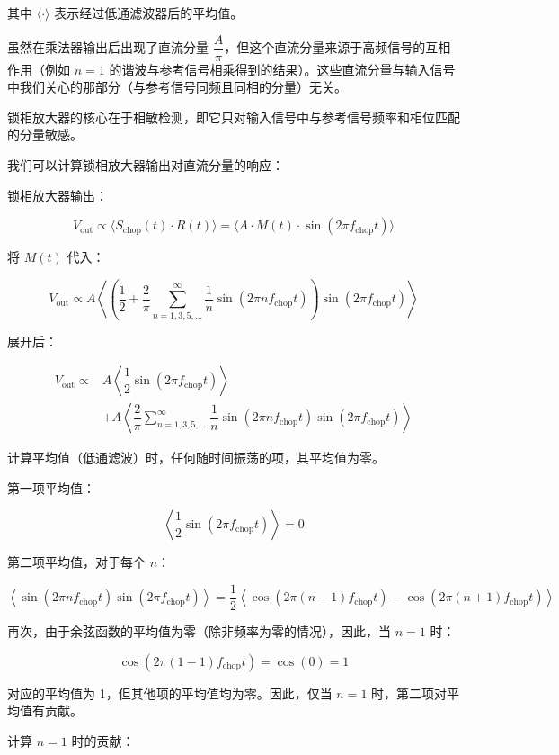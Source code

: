 \documentclass[dvipsnames, svgnames,a4paper,11pt]{article}
\begin{document}
其中 \( \langle \cdot \rangle \) 表示经过低通滤波器后的平均值。

虽然在乘法器输出后出现了直流分量 \( \dfrac{A}{\pi} \)，但这个直流分量来源于高频信号的互相作用（例如 \( n = 1 \) 的谐波与参考信号相乘得到的结果）。这些直流分量与输入信号中我们关心的那部分（与参考信号同频且同相的分量）无关。

锁相放大器的核心在于相敏检测，即它只对输入信号中与参考信号频率和相位匹配的分量敏感。

我们可以计算锁相放大器输出对直流分量的响应：

锁相放大器输出：

\[
V_{\text{out}} \propto \langle S_{\text{chop}}(t) \cdot R(t) \rangle = \langle A \cdot M(t) \cdot \sin(2\pi f_{\text{chop}} t) \rangle
\]

将 \( M(t) \) 代入：

\[
V_{\text{out}} \propto A \left\langle \left( \dfrac{1}{2} + \dfrac{2}{\pi} \sum_{n=1,3,5,\dots}^{\infty} \dfrac{1}{n} \sin(2\pi n f_{\text{chop}} t) \right) \sin(2\pi f_{\text{chop}} t) \right\rangle
\]

展开后：

\[
\begin{aligned}
	V_{\text{out}} \propto & A \left\langle \dfrac{1}{2} \sin(2\pi f_{\text{chop}} t) \right\rangle \\
	& + A \left\langle \dfrac{2}{\pi} \sum_{n=1,3,5,\dots}^{\infty} \dfrac{1}{n} \sin(2\pi n f_{\text{chop}} t) \sin(2\pi f_{\text{chop}} t) \right\rangle
\end{aligned}
\]

计算平均值（低通滤波）时，任何随时间振荡的项，其平均值为零。

第一项平均值：

\[
\left\langle \dfrac{1}{2} \sin(2\pi f_{\text{chop}} t) \right\rangle = 0
\]

第二项平均值，对于每个 \( n \)：

\[
\left\langle \sin(2\pi n f_{\text{chop}} t) \sin(2\pi f_{\text{chop}} t) \right\rangle = \dfrac{1}{2} \left\langle \cos(2\pi (n - 1) f_{\text{chop}} t) - \cos(2\pi (n + 1) f_{\text{chop}} t) \right\rangle
\]

再次，由于余弦函数的平均值为零（除非频率为零的情况），因此，当 \( n = 1 \) 时：

\[
\cos(2\pi (1 - 1) f_{\text{chop}} t) = \cos(0) = 1
\]

对应的平均值为 1，但其他项的平均值均为零。因此，仅当 \( n = 1 \) 时，第二项对平均值有贡献。

计算 \( n = 1 \) 时的贡献：
\end{document}
